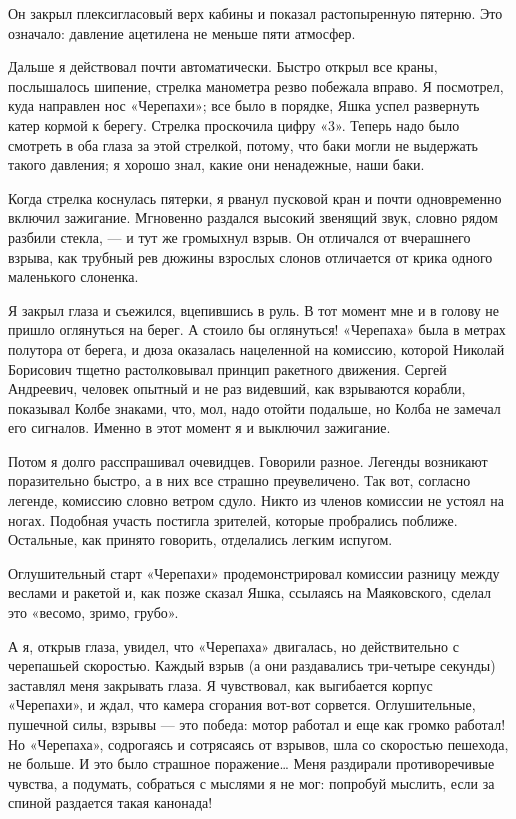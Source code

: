 Он закрыл плексигласовый верх кабины и показал растопыренную пятерню.  Это
означало: давление ацетилена не меньше пяти атмосфер.

Дальше  я  действовал  почти  автоматически.  Быстро  открыл  все   краны,
послышалось шипение, стрелка манометра резво побежала вправо. Я посмотрел,
куда направлен нос «Черепахи»; все  было в порядке, Яшка успел  развернуть
катер кормой  к берегу.  Стрелка проскочила  цифру «3».  Теперь надо  было
смотреть в оба глаза за этой стрелкой, потому, что баки могли не выдержать
такого давления; я хорошо знал, какие они ненадежные, наши баки.

Когда  стрелка  коснулась  пятерки,  я   рванул  пусковой  кран  и   почти
одновременно включил зажигание. Мгновенно раздался высокий звенящий  звук,
словно рядом разбили стекла, — и  тут же громыхнул взрыв. Он отличался  от
вчерашнего взрыва, как  трубный рев дюжины  взрослых слонов отличается  от
крика одного маленького слоненка.

Я закрыл глаза и съежился, вцепившись в руль. В тот момент мне и в  голову
не пришло оглянуться на берег. А  стоило бы оглянуться! «Черепаха» была  в
метрах полутора  от  берега,  и дюза  оказалась  нацеленной  на  комиссию,
которой Николай Борисович тщетно растолковывал принцип ракетного движения.
Сергей Андреевич,  человек  опытный  и не  раз  видевший,  как  взрываются
корабли, показывал Колбе знаками, что, мол, надо отойти подальше, но Колба
не замечал его сигналов. Именно в этот момент я и выключил зажигание.

Потом я долго расспрашивал  очевидцев. Говорили разное. Легенды  возникают
поразительно быстро, а в них  все страшно преувеличено. Так вот,  согласно
легенде, комиссию словно ветром сдуло. Никто из членов комиссии не  устоял
на ногах. Подобная участь  постигла зрителей, которые пробрались  поближе.
Остальные, как принято говорить, отделались легким испугом.

Оглушительный старт  «Черепахи» продемонстрировал  комиссии разницу  между
веслами и  ракетой и,  как  позже сказал  Яшка, ссылаясь  на  Маяковского,
сделал это «весомо, зримо, грубо».

А я, открыв глаза,  увидел, что «Черепаха»  двигалась, но действительно  с
черепашьей скоростью. Каждый взрыв (а они раздавались три-четыре  секунды)
заставлял меня  закрывать  глаза.  Я  чувствовал,  как  выгибается  корпус
«Черепахи», и ждал,  что камера сгорания  вот-вот сорвется.  Оглушительные,
пушечной силы,  взрывы  — это  победа:  мотор  работал и  еще  как  громко
работал! Но  «Черепаха»,  содрогаясь  и  сотрясаясь  от  взрывов,  шла  со
скоростью пешехода,  не  больше.  И  это  было  страшное  поражение…  Меня
раздирали противоречивые чувства,  а подумать,  собраться с  мыслями я  не
мог: попробуй мыслить, если за спиной раздается такая канонада!

